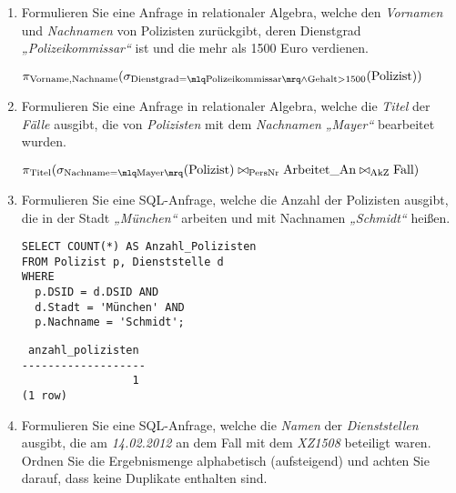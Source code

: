 \documentclass{bschlangaul-aufgabe}
\begin{document}
\begin{enumerate}


\item Formulieren Sie eine Anfrage in relationaler
Algebra, welche den \emph{Vornamen} und
\emph{Nachnamen} von Polizisten zurückgibt, deren Dienstgrad
\emph{„Polizeikommissar“} ist und die mehr als 1500 Euro verdienen.

\begin{liAntwort}
$\pi_{\text{Vorname,Nachname}}(
  \sigma_{
    \text{Dienstgrad} = \mlq \text{Polizeikommissar} \mrq
      \land
    \text{Gehalt} > 1500
  }(\text{Polizist})
)$
\end{liAntwort}


\item Formulieren Sie eine Anfrage in relationaler Algebra, welche die
\emph{Titel} der \emph{Fälle} ausgibt, die von \emph{Polizisten} mit dem
\emph{Nachnamen} \emph{„Mayer“} bearbeitet wurden.

\begin{liAntwort}
$
\pi_{\text{Titel}}(
  \sigma_{\text{Nachname} = \mlq \text{Mayer} \mrq}(\text{Polizist})
  \bowtie_{\text{PersNr}}
  \text{Arbeitet\_An}
  \bowtie_{\text{AkZ}}
  \text{Fall}
)
$
\end{liAntwort}


\item Formulieren Sie eine SQL-Anfrage, welche die Anzahl der
Polizisten ausgibt, die in der Stadt \emph{„München“} arbeiten und mit
Nachnamen \emph{„Schmidt“} heißen.

\begin{liAntwort}
\begin{verbatim}
SELECT COUNT(*) AS Anzahl_Polizisten
FROM Polizist p, Dienststelle d
WHERE
  p.DSID = d.DSID AND
  d.Stadt = 'München' AND
  p.Nachname = 'Schmidt';
\end{verbatim}

\begin{verbatim}
 anzahl_polizisten
-------------------
                 1
(1 row)
\end{verbatim}
\end{liAntwort}


\item Formulieren Sie eine SQL-Anfrage, welche die \emph{Namen} der
\emph{Dienststellen} ausgibt, die am \emph{14.02.2012} an dem Fall mit
dem \emph{XZ1508} beteiligt waren. Ordnen Sie die Ergebnismenge
alphabetisch (aufsteigend) und achten Sie darauf, dass keine Duplikate
enthalten sind.


\end{enumerate}
\end{document}
